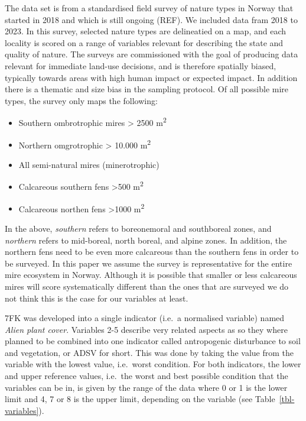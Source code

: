 \documentclass[
  super,
  preprint,
  3p]{elsarticle}
\begin{document}
The data set is from a standardised field survey of nature types in
Norway that started in 2018 and which is still ongoing (REF). We
included data fram 2018 to 2023. In this survey, selected nature types
are delineatied on a map, and each locality is scored on a range of
variables relevant for describing the state and quality of nature. The
surveys are commissioned with the goal of producing data relevant for
immediate land-use decisions, and is therefore spatially biased,
typically towards areas with high human impact or expected impact. In
addition there is a thematic and size bias in the sampling protocol. Of
all possible mire types, the survey only maps the following:

\begin{itemize}
\item
  Southern ombrotrophic mires \textgreater{} 2500 m\textsuperscript{2}
\item
  Northern omgrotrophic \textgreater{} 10.000 m\textsuperscript{2}
\item
  All semi-natural mires (minerotrophic)
\item
  Calcareous southern fens \textgreater500 m\textsuperscript{2}
\item
  Calcareous northen fens \textgreater1000 m\textsuperscript{2}
\end{itemize}

In the above, \emph{southern} refers to boreonemoral and southboreal
zones, and \emph{northern} refers to mid-boreal, north boreal, and
alpine zones. In addition, the northern fens need to be even more
calcareous than the southern fens in order to be surveyed. In this paper
we assume the survey is representative for the entire mire ecosystem in
Norway. Although it is possible that smaller or less calcareous mires
will score systematically different than the ones that are surveyed we
do not think this is the case for our variables at least.

7FK was developed into a single indicator (i.e.~a normalised variable)
named \emph{Alien plant cover}. Variables 2-5 describe very related
aspects as so they where planned to be combined into one indicator
called antropogenic disturbance to soil and vegetation, or ADSV for
short. This was done by taking the value from the variable with the
lowest value, i.e.~worst condition. For both indicators, the lower and
upper reference values, i.e.~the worst and best possible condition that
the variables can be in, is given by the range of the data where 0 or 1
is the lower limit and 4, 7 or 8 is the upper limit, depending on the
variable (see Table~\ref{tbl-variables}).
\end{document}
